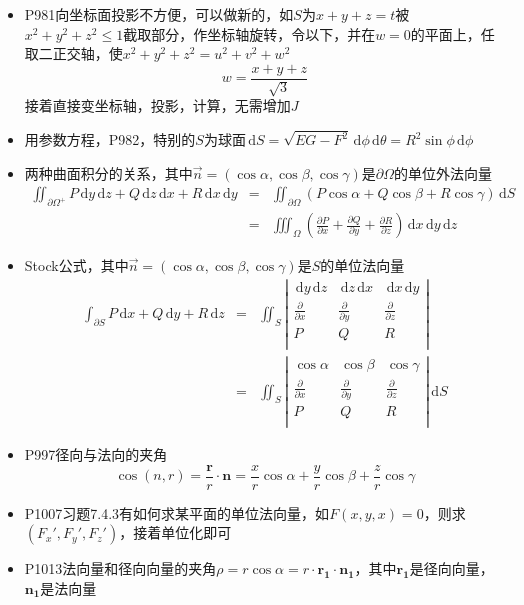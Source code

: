 \documentclass[UTF8]{ctexart}
\newcommand{\ud}{\,\mathrm{d}}
\begin{document}
\begin{itemize}
\item P981向坐标面投影不方便，可以做新的，如$S$为$x+y+z=t$被$x^2+y^2+z^2\leq 1$截取部分，作坐标轴旋转，令以下，并在$w=0$的平面上，任取二正交轴，使$x^2+y^2+z^2=u^2+v^2+w^2$
\[
w=\frac{x+y+z}{\sqrt{3}}
\]
接着直接变坐标轴，投影，计算，无需增加$J$

\item 用参数方程，P982，特别的$S$为球面$\ud S=\sqrt{EG-F^2}\ud \phi\ud \theta = R^2\sin\phi \ud \phi $

\item 两种曲面积分的关系，其中$\vec{n} = (\cos \alpha,\cos\beta,\cos\gamma)$是$\partial\Omega$的单位外法向量
\begin{eqnarray*}
\iint_{\partial\Omega^+}P\ud y\ud z + Q\ud z\ud x+ R\ud x\ud y &=& \iint_{\partial\Omega}(P\cos \alpha + Q\cos \beta+ R\cos \gamma)\ud S \\
&=& \iiint_{\Omega}\left(\frac{\partial P}{\partial x}+\frac{\partial Q}{\partial y}+\frac{\partial R}{\partial z}\right)\ud x\ud y\ud z
\end{eqnarray*}

\item Stock公式，其中$\vec{n} = (\cos \alpha,\cos\beta,\cos\gamma)$是$S$的单位法向量
\begin{eqnarray*}
\int_{\partial S}P\ud x+Q\ud y+R\ud z&=&\iint_S\left|
\begin{array}{ccc}
\ud y\ud z&\ud z\ud x&\ud x\ud y\\
\frac{\partial}{\partial x}&\frac{\partial}{\partial y}&\frac{\partial}{\partial z}\\
P&Q&R\\
\end{array}
\right| \\
&=& \iint_S\left|
\begin{array}{ccc}
\cos \alpha&\cos\beta&\cos\gamma\\
\frac{\partial}{\partial x}&\frac{\partial}{\partial y}&\frac{\partial}{\partial z}\\
P&Q&R\\
\end{array}
\right| \ud S
\end{eqnarray*}

\item P997径向与法向的夹角
\[
\cos(n,r) = \frac{\mathbf{r}}{r}\cdot \mathbf{n} = \frac{x}{r}\cos \alpha +\frac{y}{r}\cos\beta +\frac{z}{r}\cos \gamma
\]

\item P1007习题7.4.3有如何求某平面的单位法向量，如$F(x,y,x)=0$，则求$(F_x',F_y',F_z')$，接着单位化即可

\item P1013法向量和径向向量的夹角$\rho = r \cos\alpha = r\cdot\mathbf{r_1}\cdot\mathbf{n_1}$，其中$\mathbf{r_1}$是径向向量，$\mathbf{n_1}$是法向量
\end{itemize}
\end{document}
